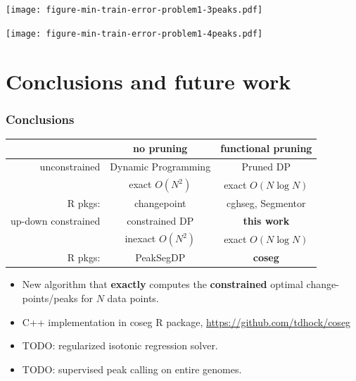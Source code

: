 \documentclass{beamer}
\begin{document}
\begin{frame}
  \texttt{[image: figure-min-train-error-problem1-3peaks.pdf]}
\end{frame}

\begin{frame}
  \texttt{[image: figure-min-train-error-problem1-4peaks.pdf]}
\end{frame}

\section{Conclusions and future work}

\begin{frame}
  \frametitle{Conclusions}
  \begin{tabular}{r|c|c}
    & no pruning & functional pruning \\
    \hline
    unconstrained & Dynamic Programming & Pruned DP \\
     & exact $O(N^2)$ & exact $O(N\log N)$\\
    R pkgs: & changepoint & cghseg, Segmentor\\
    \hline
    up-down constrained & constrained DP & \textbf{this work} \\
     & inexact $O(N^2)$ & exact $O(N\log N)$\\
    R pkgs: & PeakSegDP & \textbf{coseg}\\
    \hline
  \end{tabular}
  \begin{itemize}
  \item New algorithm that \textbf{exactly} computes the
    \textbf{constrained} optimal change-points/peaks for $N$ data points.
  \item C++ implementation in coseg R package, 
    \url{https://github.com/tdhock/coseg}
  \item TODO: regularized isotonic regression solver.
  \item TODO: supervised peak calling on entire genomes.
  \end{itemize}
\end{frame}
\end{document}
